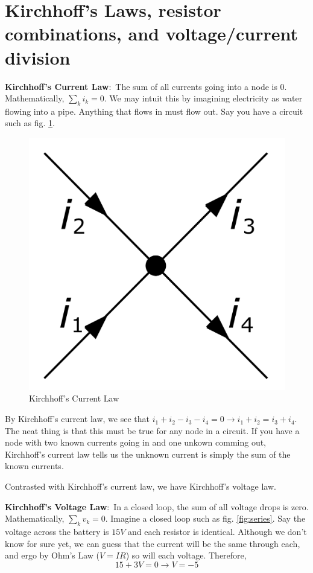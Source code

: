 \documentclass[nobib]{tufte-handout}
\newcommand{\defn}[2]{\noindent\textbf{#1}:\ #2}
\begin{document}
\section{Kirchhoff's Laws, resistor combinations, and voltage/current division}
\defn{Kirchhoff's Current Law}{The sum of all currents going into
a node is 0. Mathematically, $\sum_k i_k = 0$}. We may intuit 
this by imagining electricity as water flowing into a pipe. Anything that flows 
in must flow out.
Say you have a circuit such as fig. \ref{fig:kcl}. 
\begin{figure}
    \center
    \includegraphics[width=\textwidth/2]{images/1200px-Kirchhoff's_Current_Law.svg.png}
    \caption{Kirchhoff's Current Law}
    \label{fig:kcl}
\end{figure}
By Kirchhoff's
current law, we see that $i_1+i_2-i_3-i_4 = 0 \rightarrow i_1 + i_2 = i_3 +i_4$.
The neat thing is that this must be true for any node in a circuit. 
If you have a node with two known currents going in and one unkown comming out,
Kirchhoff's current law tells us the unknown current is simply the sum
of the known currents. 

Contrasted with Kirchhoff's current law, we have Kirchhoff's voltage
law. 

\defn{Kirchhoff's Voltage Law}{In a closed loop, the sum
of all voltage drops is zero. Mathematically, $\sum_k v_k = 0$}.
Imagine a closed loop such as fig. \ref{fig:series}.
Say the voltage across the battery is $15V$ and each resistor
is identical. Although we don't know for sure yet, we can guess
that the current will be the same through each, and ergo
by Ohm's Law ($V=IR$) so will each voltage. Therefore,
\[15 + 3V = 0 \rightarrow V = -5\]
\end{document}
